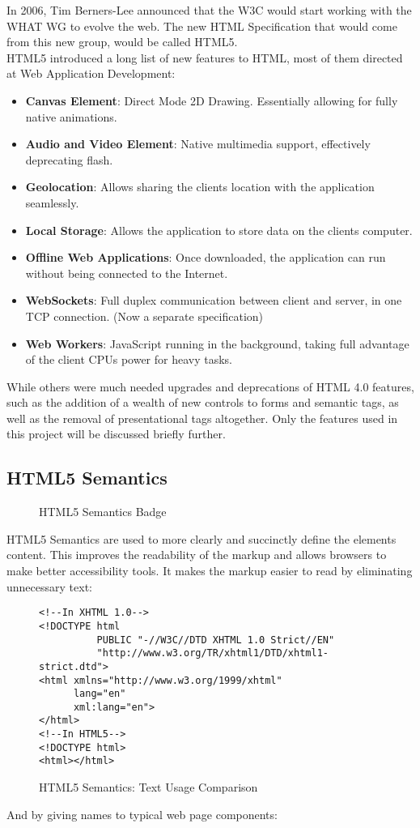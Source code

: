 In 2006, Tim Berners-Lee announced that the W3C would start working with the WHAT WG to evolve the web. The new HTML
Specification that would come from this new group, would be called HTML5.\\

HTML5 introduced a long list of new features to HTML, most of them directed at Web Application Development:
\begin{itemize}
  \item \textbf{Canvas Element}: Direct Mode 2D Drawing. Essentially allowing for fully native animations.
  \item \textbf{Audio and Video Element}: Native multimedia support, effectively deprecating flash.
  \item \textbf{Geolocation}: Allows sharing the clients location with the application seamlessly.
  \item \textbf{Local Storage}: Allows the application to store data on the clients computer.
  \item \textbf{Offline Web Applications}: Once downloaded, the application can run without being connected to the Internet.
  \item \textbf{WebSockets}: Full duplex communication between client and server, in one TCP connection. (Now a separate specification)
  \item \textbf{Web Workers}: JavaScript running in the background, taking full advantage of the client CPUs power for heavy tasks.
\end{itemize}
While others were much needed upgrades and deprecations of HTML 4.0 features, such as the addition of a wealth of new
controls to forms and semantic tags, as well as the removal of presentational tags altogether. Only the features used in
this project will be discussed briefly further.
\subsection{HTML5 Semantics}
\begin{figure}[h]
\centering

\caption{HTML5 Semantics Badge}
\end{figure}
HTML5 Semantics are used to more clearly and succinctly define the elements content. This improves the readability of the
markup and allows browsers to make better accessibility tools. It makes the markup easier to read by eliminating
unnecessary text:\\

\begin{figure}[h]
\centering
{}
\begin{verbatim}
<!--In XHTML 1.0-->
<!DOCTYPE html
          PUBLIC "-//W3C//DTD XHTML 1.0 Strict//EN"
          "http://www.w3.org/TR/xhtml1/DTD/xhtml1-strict.dtd">
<html xmlns="http://www.w3.org/1999/xhtml"
      lang="en"
      xml:lang="en">
</html>
<!--In HTML5-->
<!DOCTYPE html>
<html></html>
\end{verbatim}
\caption{HTML5 Semantics: Text Usage Comparison}
\end{figure}
And by giving names to typical web page components:\\

